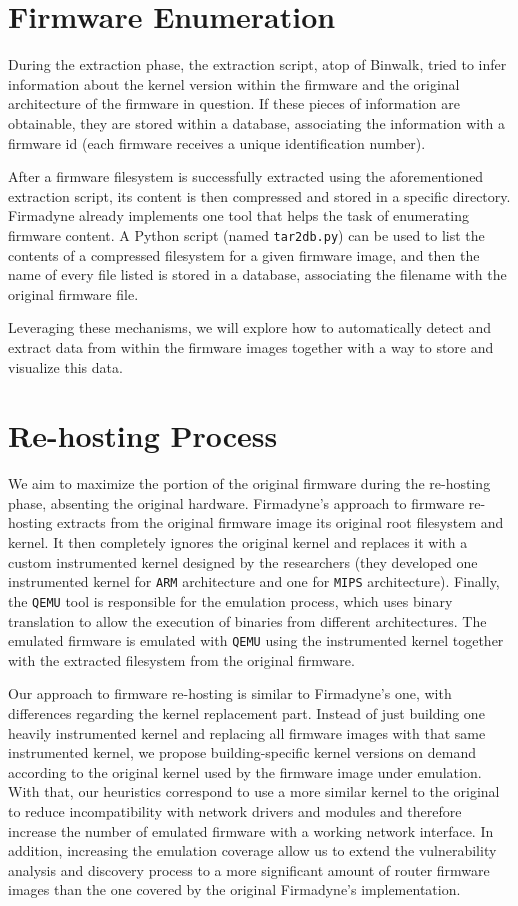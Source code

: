 \section{Firmware Enumeration}

During the extraction phase, the extraction script, atop of Binwalk, tried to infer information about the kernel version within the firmware and the original architecture of the firmware in question. If these pieces of information are obtainable, they are stored within a database, associating the information with a firmware id (each firmware receives a unique identification number).

After a firmware filesystem is successfully extracted using the aforementioned extraction script, its content is then compressed and stored in a specific directory. Firmadyne already implements one tool that helps the task of enumerating firmware content. A Python script (named {\tt tar2db.py}) can be used to list the contents of a compressed filesystem for a given firmware image, and then the name of every file listed is stored in a database, associating the filename with the original firmware file.

Leveraging these mechanisms, we will explore how to automatically detect and extract data from within the firmware images together with a way to store and visualize this data.

\section{Re-hosting Process}
\label{sec:re-hosting}

We aim to maximize the portion of the original firmware during the re-hosting phase, absenting the original hardware. Firmadyne's approach to firmware re-hosting extracts from the original firmware image its original root filesystem and kernel. It then completely ignores the original kernel and replaces it with a custom instrumented kernel designed by the researchers (they developed one instrumented kernel for {\tt ARM} architecture and one for {\tt MIPS} architecture). Finally, the {\tt QEMU} tool is responsible for the emulation process, which uses binary translation to allow the execution of binaries from different architectures. The emulated firmware is emulated with {\tt QEMU} using the instrumented kernel together with the extracted filesystem from the original firmware.

Our approach to firmware re-hosting is similar to Firmadyne's one, with differences regarding the kernel replacement part. Instead of just building one heavily instrumented kernel and replacing all firmware images with that same instrumented kernel, we propose building-specific kernel versions on demand according to the original kernel used by the firmware image under emulation. With that, our heuristics correspond to use a more similar kernel to the original to reduce incompatibility with network drivers and modules and therefore increase the number of emulated firmware with a working network interface. In addition, increasing the emulation coverage allow us to extend the vulnerability analysis and discovery process to a more significant amount of router firmware images than the one covered by the original Firmadyne's implementation.

